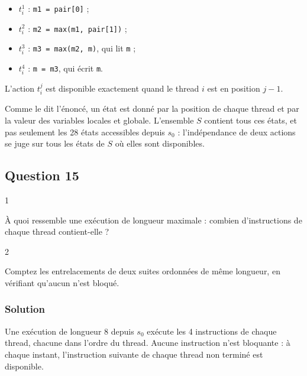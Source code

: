 \documentclass[11pt,a4paper]{article}
\providecommand{\tightlist}{\setlength{\itemsep}{0pt}\setlength{\parskip}{0pt}}
\begin{document}
\begin{itemize}
\tightlist
\item
  \(t_i^1\) : \texttt{m1\ =\ pair{[}0{]}} ;
\item
  \(t_i^2\) : \texttt{m2\ =\allowbreak{}\ max(\allowbreak{}m1,\allowbreak{}\ pair{[}1{]}\allowbreak{})\allowbreak{}} ;
\item
  \(t_i^3\) : \texttt{m3\ =\ max(m2,\ m)}, qui lit \texttt{m} ;
\item
  \(t_i^4\) : \texttt{m\ =\ m3}, qui écrit \texttt{m}.
\end{itemize}

L'action \(t_i^j\) est disponible exactement quand le thread \(i\) est en position \(j-1\).

Comme le dit l'énoncé, un état est donné par la position de chaque thread et par la valeur des variables locales et globale. L'ensemble \(S\) contient tous ces états, et pas seulement les 28 états accessibles depuis \(s_0\) : l'indépendance de deux actions se juge sur tous les états de \(S\) où elles sont disponibles.

\hypertarget{question-15}{%
\subsection{Question 15}\label{question-15}}

\begin{indication}{1}

À quoi ressemble une exécution de longueur maximale : combien d'instructions de chaque thread contient-elle ?

\end{indication}

\begin{indication}{2}

Comptez les entrelacements de deux suites ordonnées de même longueur, en vérifiant qu'aucun n'est bloqué.

\end{indication}

\hypertarget{solution-14}{%
\subsubsection{Solution}\label{solution-14}}

Une exécution de longueur 8 depuis \(s_0\) exécute les 4 instructions de chaque thread, chacune dans l'ordre du thread. Aucune instruction n'est bloquante : à chaque instant, l'instruction suivante de chaque thread non terminé est disponible.
\end{document}

